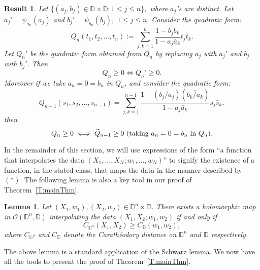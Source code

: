 \documentclass[11pt, reqno]{amsart}
\numberwithin{equation}{section}
\theoremstyle{definition}
\theoremstyle{remark}
\theoremstyle{plain}
\newtheorem{result}[definition]{Result}
\newtheorem{lemma}[definition]{Lemma}
\begin{document}
\begin{result}\label{R:quadposi}
Let $\{(a_j,b_j)\in{\mathbb{D}}\times{\mathbb{D}}: 1\leq j\leq n\},$ where $a_j$'s are distinct.
Let $a_j'=\psi_{a_n}(a_j)$ and $b_j'=\psi_{b_n}(b_j),\,\,1\leq j\leq n.$
Consider the quadratic form:
\begin{equation*}
Q_n(t_1,t_2,\ldots,t_n):=\sum_{j,k=1}^{n}\frac{1-b_j\bar{b}_k}{1-a_j\bar{a}_k}t_j\bar{t}_k.
\end{equation*}
Let $Q_n'$ be the quadratic form obtained from $Q_n$ by replacing $a_j$ with $a_j'$ and $b_j$ with $b_j'.$ Then
\begin{equation*}
Q_n\geq 0 \iff Q_n'\geq 0.
\end{equation*} 
Moreover if we take $a_n=0=b_n$ in $Q_n$, and consider the quadratic form:
\begin{equation*}
\widetilde{Q}_{n-1}(s_1,s_2,\ldots,s_{n-1})=\sum_{j,k=1}^{n-1}\frac{1-({b_j}/{a_j})(\overline{{b_k}/{a_k}})}{1-a_j\bar{a}_k}
s_j\bar{s}_k,
\end{equation*}
then
\begin{equation*}
Q_n\geq 0 \iff \widetilde{Q}_{n-1}\geq 0 \\\ \text{(taking $a_n=0=b_n$ in $Q_n$)}.
\end{equation*}
\end{result}
\smallskip

In the remainder of this section, we will use expressions of the form
``a function that interpolates the data $(X_1,\ldots,X_N;w_1,\ldots,w_N)$''
to signify the existence of a function, in the stated class, that maps the data in the manner described by $(*).$
The following lemma is also a key tool in our proof of Theorem~\ref{T:mainThm}.
\begin{lemma}\label{L:twointer}
Let $(X_1,w_1),(X_2,w_2)\in{\mathbb{D}}^n\times{\mathbb{D}}.$ There exists a holomorphic map in ${\mathcal{O}}({\mathbb{D}}^n,{\mathbb{D}})$
interpolating the data $(X_1,X_2;w_1,w_2)$ if and only if
\begin{equation*}
C_{{\mathbb{D}}^n}(X_1,X_2)\geq C_{\mathbb{D}}(w_1,w_2),
\end{equation*}
where $C_{{\mathbb{D}}^n}$ and $C_{\mathbb{D}}$ denote the Carath{\'e}odory distance on ${\mathbb{D}}^n$ and ${\mathbb{D}}$ respectively.
\end{lemma}
\smallskip

The above lemma is a standard application of the Schwarz lemma.
We now have all the tools to present the proof of Theorem~\ref{T:mainThm}.
\end{document}
